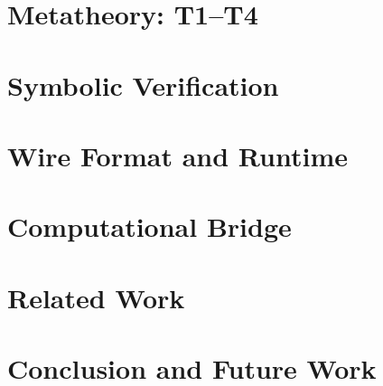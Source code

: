 \documentclass[acmsmall,nonacm]{acmart}
\begin{document}
\section{Metatheory: T1--T4}
\label{sec:metatheory}


\section{Symbolic Verification}
\label{sec:symbolic}


\section{Wire Format and Runtime}
\label{sec:wire}


\section{Computational Bridge}
\label{sec:computational}


\section{Related Work}
\label{sec:related}


\section{Conclusion and Future Work}
\label{sec:conclusion}




\end{document}
